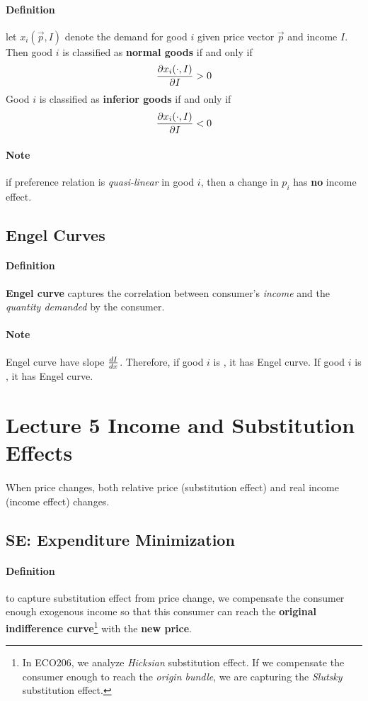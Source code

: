 \documentclass{article}
\begin{document}
			\paragraph{Definition} let $x_i(\vec{p}, I)$ denote the demand for good $i$ given price vector $\vec{p}$ and income $I$. Then good $i$ is classified as \textbf{normal goods} if and only if
				\[
					\frac{\partial{x_i(\cdot, I)}}{\partial{I}} > 0
				\]
				Good $i$ is classified as \textbf{inferior goods} if and only if 
				\[
					\frac{\partial{x_i(\cdot, I)}}{\partial{I}} < 0
				\]
			\paragraph{Note} if preference relation is \emph{quasi-linear} in good $i$, then a change in $p_i$ has \textbf{no} income effect.
		\subsection{Engel Curves}
			\paragraph{Definition} \textbf{Engel curve} captures the correlation between consumer's \emph{income} and the \emph{quantity demanded} by the consumer.
			\paragraph{Note} Engel curve have slope $\frac{d{I}}{d{x}}$. Therefore, if good $i$ is , it has  Engel curve. If good $i$ is , it has  Engel curve.
		
	\section{Lecture 5 Income and Substitution Effects}
		\paragraph{} When price changes, both relative price (substitution effect) and real income (income effect) changes.
		
		\subsection{SE: Expenditure Minimization}
			\paragraph{Definition} to capture substitution effect from price change, we compensate the consumer enough exogenous income so that this consumer can reach the \textbf{original indifference curve}\footnote{In ECO206, we analyze \emph{Hicksian} substitution effect. If we compensate the consumer enough to reach the \emph{origin bundle}, we are capturing the \emph{Slutsky} substitution effect.} with the \textbf{new price}.
			
\end{document}
